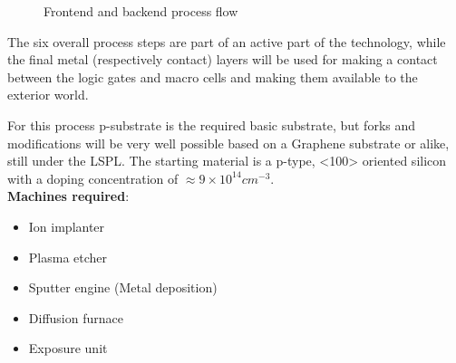 \begin{figure}[H]
	\caption{Frontend and backend process flow}
	\label{full_flow}
\end{figure}
The six overall process steps are part of an active part of the technology, while the final metal (respectively contact) layers will be used for making a contact between the logic gates and macro cells and making them available to the exterior world.

For this process p-substrate is the required basic substrate, but forks and modifications will be very well possible based on a Graphene substrate or alike, still under the LSPL.
The starting material is a p-type, <100> oriented silicon with a doping concentration of $\approx 9\times10^{14}cm^{-3}$.\\

\textbf{Machines required}:
\begin{itemize}
	\item Ion implanter
	\item Plasma etcher
	\item Sputter engine (Metal deposition) 
	\item Diffusion furnace
	\item Exposure unit
\end{itemize}

